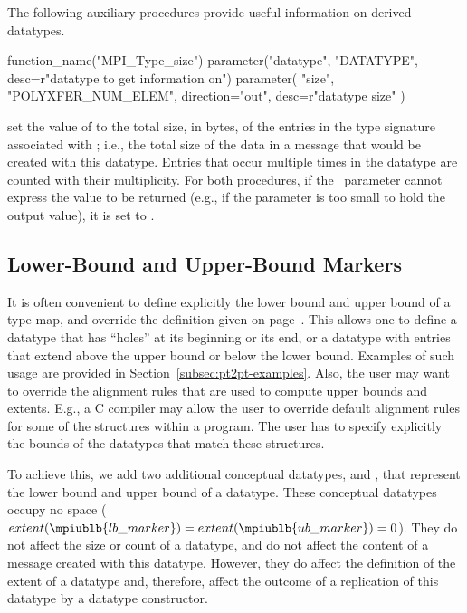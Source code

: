 The following auxiliary procedures provide useful information on
derived datatypes.

\begin{mpi-binding}
    function_name("MPI_Type_size")
    parameter("datatype", "DATATYPE", desc=r"datatype to get information on")
    parameter(
        "size", "POLYXFER_NUM_ELEM", direction="out", desc=r"datatype size"
    )
\end{mpi-binding}

set the value of  to the total size, in bytes, of the entries in
the type signature
associated with ; i.e., the total size of
the data in a message that would be created with this datatype.  Entries that
occur multiple times in the datatype are counted with their multiplicity.
%
For both procedures, if the \OUT\ parameter cannot express the value to
be returned (e.g., if the parameter is too small to hold the output
value), it is set to .

\subsection{Lower-Bound and Upper-Bound Markers}
\label{subsec:pt2pt-markers}

It is often convenient to define explicitly the lower bound and upper
bound of a type map, and override the definition given
on page~\pageref{eq:pt2pt-extent}.
This allows one to define a datatype that
has ``holes'' at its beginning or its end, or a datatype with
entries that extend above the upper bound or below the lower bound.
Examples of
such usage are provided in Section~\ref{subsec:pt2pt-examples}.
Also, the user may want to override the alignment rules that are
used to compute upper bounds and extents.  E.g., a C compiler may allow
the user to override default alignment rules for some of the
structures within
a program.  The user has to specify explicitly the bounds of the datatypes
that match these structures.

To achieve this, we add two additional conceptual datatypes,
 and\flushline
{}, that represent the lower
bound and upper
bound of a datatype.  These conceptual datatypes occupy no space
($extent(\mpiublb{lb\_marker}) = extent(\mpiublb{ub\_marker}) =0$).
They do not
affect the size or count of a datatype, and do not affect the
 content of a message created with this datatype.  However, they do
affect the definition of the
extent of a datatype and, therefore, affect the outcome of a replication of
this datatype by a datatype constructor.

